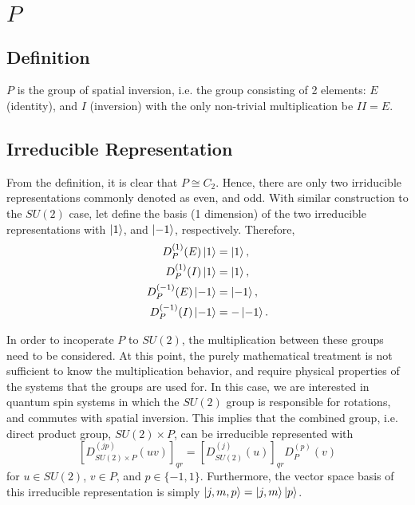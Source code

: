 \documentclass[preprint, 12pt]{revtex4-2}
\numberwithin{equation}{section}
\begin{document}
\section{$P$}

\subsection{Definition}
$P$ is the group of spatial inversion, i.e. the group consisting of 2 elements: $E$ (identity), and $I$ (inversion) with the only non-trivial multiplication be $II=E$.

\subsection{Irreducible Representation}
From the definition, it is clear that $P \cong C_2$. Hence, there are only two irriducible representations commonly denoted as even, and odd. With similar construction to the $SU(2)$ case, let define the basis (1 dimension) of the two irreducible representations with $\ket{1}$, and $\ket{-1}$, respectively. Therefore, 
\begin{equation}
    \begin{aligned}
        D_P^{(1)}(E)\ket{1} &= \ket{1}, \\
        D_P^{(1)}(I)\ket{1} &= \ket{1}, \\
        D_P^{(-1)}(E)\ket{-1} &= \ket{-1}, \\
        D_P^{(-1)}(I)\ket{-1} &=-\ket{-1}.
    \end{aligned}
\end{equation}

In order to incoperate $P$ to $SU(2)$, the multiplication between these groups need to be considered. At this point, the purely mathematical treatment is not sufficient to know the multiplication behavior, and require physical properties of the systems that the groups are used for. In this case, we are interested in quantum spin systems in which the $SU(2)$ group is responsible for rotations, and commutes with spatial inversion. This implies that the combined group, i.e. direct product group, $SU(2)\times P$, can be irreducible represented with
\begin{equation}
    \left[D_{SU(2)\times P}^{(jp)}(uv)\right]_{qr} = \left[D_{SU(2)}^{(j)}(u)\right]_{qr}D_P^{(p)}(v)
\end{equation}
for $u\in SU(2)$, $v\in P$, and $p\in \{-1, 1\}$. Furthermore, the vector space basis of this irreducible representation is simply $\ket{j, m, p}=\ket{j, m}\ket{p}$.
\end{document}
